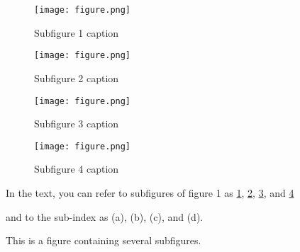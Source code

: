 \documentclass{book}
\begin{document}
        
\begin{figure}
\centering
\begin{subfigure}[b]{0.49\textwidth}
    \texttt{[image: figure.png]}
    \caption{Subfigure 1 caption}
    \label{fig:first}
\end{subfigure}
\hfill
\begin{subfigure}[b]{0.49\textwidth}
    \texttt{[image: figure.png]}
    \caption{Subfigure 2 caption}
    \label{fig:second}
\end{subfigure}

\medskip 

\begin{subfigure}[b]{0.49\textwidth}
    \texttt{[image: figure.png]}
    \caption{Subfigure 3 caption}
    \label{fig:third}
\end{subfigure}
\hfill
\begin{subfigure}[b]{0.49\textwidth}
    \texttt{[image: figure.png]}
    \caption{Subfigure 4 caption}
    \label{fig:fourth} 
\end{subfigure}
        
\caption{This is a figure containing several subfigures.}
\label{fig:figures} 

\vspace{12pt}
In the text, you can refer to subfigures of figure 1 as \ref{fig:first}, \ref{fig:second}, \ref{fig:third}, and \ref{fig:fourth}\par
and to the sub-index as (a), (b), (c), and (d).

\end{figure}
\end{document}
